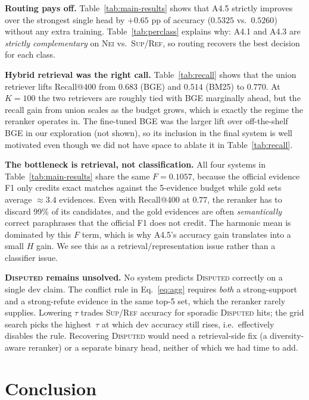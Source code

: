 \documentclass[11pt]{article}
\begin{document}
\textbf{Routing pays off.} Table~\ref{tab:main-results} shows that
A4.5 strictly improves over the strongest single head by $+0.65$ pp
of accuracy ($0.5325$ vs.\ $0.5260$) without any extra training.
Table~\ref{tab:perclass} explains why: A4.1 and A4.3 are
\emph{strictly complementary} on \textsc{Nei} vs.\
\textsc{Sup}/\textsc{Ref}, so routing recovers the best decision for
each class.

\textbf{Hybrid retrieval was the right call.}
Table~\ref{tab:recall} shows that the union retriever lifts
Recall@400 from $0.683$ (BGE) and $0.514$ (BM25) to $0.770$. At
$K{=}100$ the two retrievers are roughly tied with BGE marginally
ahead, but the recall gain from union scales as the budget grows,
which is exactly the regime the reranker operates in. The fine-tuned
BGE was the larger lift over off-the-shelf BGE in our exploration
(not shown), so its inclusion in the final system is well motivated
even though we did not have space to ablate it in
Table~\ref{tab:recall}.

\textbf{The bottleneck is retrieval, not classification.} All four
systems in Table~\ref{tab:main-results} share the same
$F\!=\!0.1057$, because the official evidence F1 only credits exact
matches against the 5-evidence budget while gold sets average
$\approx 3.4$ evidences. Even with Recall@400 at $0.77$, the
reranker has to discard 99\% of its candidates, and the gold
evidences are often \emph{semantically} correct paraphrases that
the official F1 does not credit. The harmonic mean is dominated by
this $F$ term, which is why A4.5's accuracy gain translates into a
small $H$ gain. We see this as a retrieval/representation issue
rather than a classifier issue.

\textbf{\textsc{Disputed} remains unsolved.} No system predicts
\textsc{Disputed} correctly on a single dev claim. The conflict rule
in Eq.~\ref{eq:agg} requires \emph{both} a strong-support and a
strong-refute evidence in the same top-5 set, which the reranker
rarely supplies. Lowering $\tau$ trades \textsc{Sup}/\textsc{Ref}
accuracy for sporadic \textsc{Disputed} hits; the grid search picks
the highest~$\tau$ at which dev accuracy still rises, i.e.\
effectively disables the rule. Recovering \textsc{Disputed} would
need a retrieval-side fix (a diversity-aware reranker) or a separate
binary head, neither of which we had time to add.

\section{Conclusion}
\end{document}
